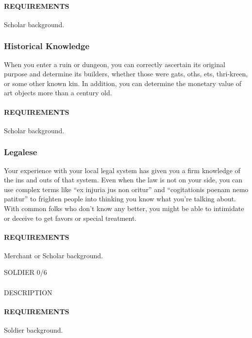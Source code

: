     \paragraph{REQUIREMENTS} Scholar background.

    \subsubsection{Historical Knowledge} \label{feat::historicalknowledge}
    When you enter a ruin or dungeon, you can correctly ascertain its original purpose and determine its builders, whether those were gats, oths, ets, thri-kreen, or some other known kin.
    In addition, you can determine the monetary value of art objects more than a century old.
    \paragraph{REQUIREMENTS} Scholar background.

    \subsubsection{Legalese} \label{feat::legalese}
    Your experience with your local legal system has given you a firm knowledge of the ins and outs of that system.
    Even when the law is not on your side, you can use complex terms like ``ex injuria jus non oritur'' and ``cogitationis poenam nemo patitur'' to frighten people into thinking you know what you're talking about.
    With common folks who don't know any better, you might be able to intimidate or deceive to get favors or special treatment.
    \paragraph{REQUIREMENTS} Merchant or Scholar background.

SOLDIER 0/6
    \subsubsection{} \label{feat::NAME}
    DESCRIPTION
    \paragraph{REQUIREMENTS} Soldier background.


